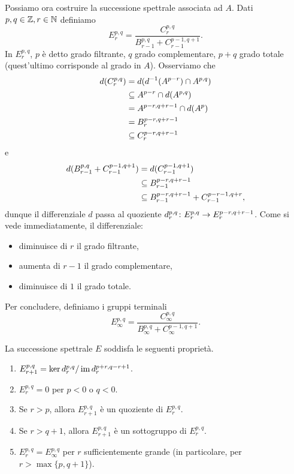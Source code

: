 Possiamo ora costruire la successione spettrale associata ad $A$. Dati $p,q\in\mathbb{Z},r\in\mathbb{N}$ definiamo
$$
E^{p,q}_r=\frac{C^{p,q}_r}{B^{p,q}_{r-1}+C^{p-1,q+1}_{r-1}}.
$$
In $E^{p,q}_r$, $p$ è detto grado filtrante, $q$ grado complementare, $p+q$ grado totale (quest'ultimo corrisponde al grado in $A$).
Osserviamo che 
\begin{align*}
d(C^{p,q}_r)&=d(d^{-1}(A^{p-r})\cap A^{p,q})\\
&\subseteq A^{p-r}\cap d(A^{p,q})\\
&=A^{p-r,q+r-1}\cap d(A^p)\\
&=B^{p-r,q+r-1}_r\\
&\subseteq C^{p-r,q+r-1}_r
\end{align*}
e
\begin{align*}
d(B^{p,q}_{r-1}+C^{p-1,q+1}_{r-1})&=d(C^{p-1,q+1}_{r-1})\\
&\subseteq B^{p-r,q+r-1}_{r-1}\\
&\subseteq B^{p-r,q+r-1}_{r-1}+C^{p-r-1,q+r}_{r-1},
\end{align*}
dunque il differenziale $d$ passa al quoziente $d^{p,q}_r\colon E^{p,q}_r\to E^{p-r,q+r-1}_r$. Come si vede immediatamente, il differenziale:
\begin{itemize}
\item diminuisce di $r$ il grado filtrante,
\item aumenta di $r-1$ il grado complementare,
\item diminuisce di $1$ il grado totale.
\end{itemize}
Per concludere, definiamo i gruppi terminali
$$
E^{p,q}_\infty=\frac{C^{p,q}_\infty}{B^{p,q}_\infty+C^{p-1,q+1}_\infty}.
$$
\begin{proposition}
La successione spettrale $E$ soddisfa le seguenti proprietà.
\begin{enumerate}
\item $E^{p,q}_{r+1}=\ker d^{p,q}_r/\operatorname{im} d^{p+r,q-r+1}_r$.
\item $E^{p,q}_r=0$ per $p<0$ o $q<0$.
\item Se $r>p$, allora $E^{p,q}_{r+1}$ è un quoziente di $E^{p,q}_r$.
\item Se $r>q+1$, allora $E^{p,q}_{r+1}$ è un sottogruppo di $E^{p,q}_r$.
\item $E^{p,q}_r=E^{p,q}_\infty$ per $r$ sufficientemente grande (in particolare, per $r>\max\{p,q+1\}$).
\end{enumerate}
\end{proposition}
